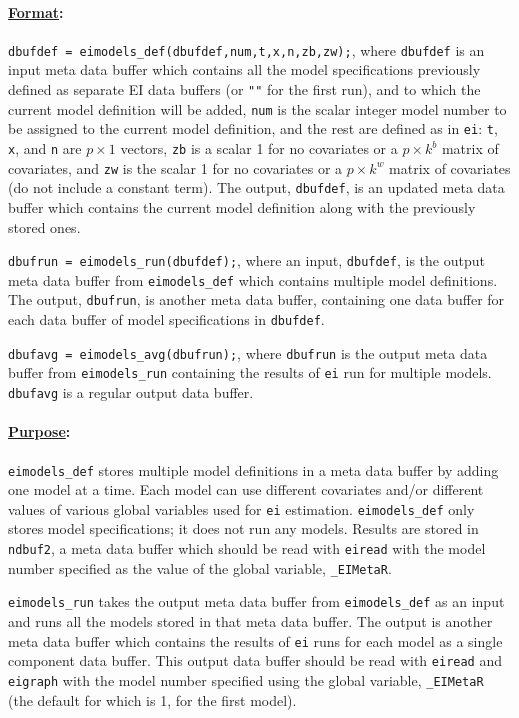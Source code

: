 \documentclass[11pt,titlepage]{article}
\begin{document}
\paragraph{\underline{Format}:} 
\texttt{dbufdef = eimodels\_def(dbufdef,num,t,x,n,zb,zw);}, where
\texttt{dbufdef} is an input meta data buffer which contains all the
model specifications previously defined as separate EI data buffers
(or \texttt{""} for the first run), and to which the current model
definition will be added, \texttt{num} is the scalar integer model
number to be assigned to the current model definition, and the rest
are defined as in \texttt{ei}: \texttt{t}, \texttt{x}, and \texttt{n}
are $p\times 1$ vectors, \texttt{zb} is a scalar 1 for no covariates
or a $p\times k^b$ matrix of covariates, and \texttt{zw} is the scalar
1 for no covariates or a $p\times k^w$ matrix of covariates (do not
include a constant term).  The output, \texttt{dbufdef}, is an updated
meta data buffer which contains the current model definition along
with the previously stored ones.

\texttt{dbufrun = eimodels\_run(dbufdef);}, where an input,
\texttt{dbufdef}, is the output meta data buffer from
\texttt{eimodels\_def} which contains multiple model definitions. The
output, \texttt{dbufrun}, is another meta data buffer, containing one
data buffer for each data buffer of model specifications in \texttt{dbufdef}.

\texttt{dbufavg = eimodels\_avg(dbufrun);}, where \texttt{dbufrun} is the
output meta data buffer from \texttt{eimodels\_run} containing the
results of \texttt{ei} run for multiple models. \texttt{dbufavg} is a
regular output data buffer.

\paragraph{\underline{Purpose}:}
\texttt{eimodels\_def} stores multiple model definitions in a meta
data buffer by adding one model at a time.  Each model can use
different covariates and/or different values of various global
variables used for \texttt{ei} estimation.  \texttt{eimodels\_def}
only stores model specifications; it does not run any models.  Results
are stored in \texttt{ndbuf2}, a meta data buffer which should be read
with \texttt{eiread} with the model number specified as the value of
the global variable, \texttt{\_EIMetaR}.

\texttt{eimodels\_run} takes the output meta data buffer from
\texttt{eimodels\_def} as an input and runs all the models stored in
that meta data buffer.  The output is another meta data buffer which
contains the results of \texttt{ei} runs for each model as a single
component data buffer. This output data buffer should be read with
\texttt{eiread} and \texttt{eigraph} with the model number specified
using the global variable, \texttt{\_EIMetaR} (the default for which
is 1, for the first model).
\end{document}

